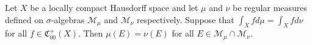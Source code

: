 Let $X$ be a locally compact Hausdorff space and let $\mu$ and $\nu$ be regular measures defined on $\sigma$-algebras $\mathcal{M}_\mu$ and $\mathcal{M}_\nu$ respectively. Suppose that $\int_X f d\mu = \int_X f d\nu$ for all $f \in \mathfrak{C}_{00}^+(X)$. Then $\mu(E) = \nu(E)$ for all $E \in \mathcal{M}_\mu \cap \mathcal{M}_\nu$.
